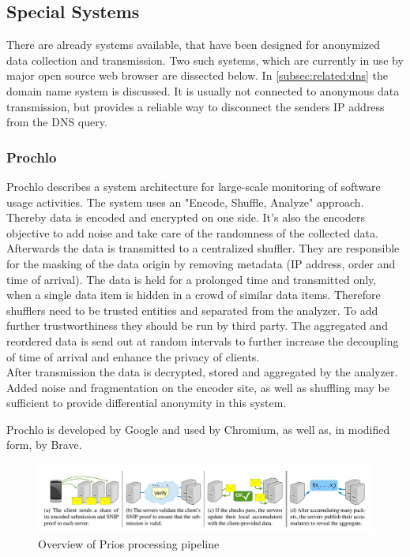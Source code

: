     
    \subsection{Special Systems}
        \label{subsec:related:special}
        There are already systems available, that have been designed for anonymized data collection and transmission. 
        Two such systems, which are currently in use by major open source web browser are dissected below. In \ref{subsec:related:dns} the domain name system is discussed. It is usually not connected to anonymous data transmission, but provides a reliable way to disconnect the senders IP address from the DNS query.
        
    \subsubsection{Prochlo}
        Prochlo describes a system architecture for large-scale monitoring of software usage activities. The system uses an "Encode, Shuffle, Analyze" approach. Thereby data is encoded and encrypted on one side. It's also the encoders objective to add noise and take care of the randomness of the collected data\cite{bittau_prochlo_2017}.\\
        Afterwards the data is transmitted to a centralized shuffler. They are responsible for the masking of the data origin by removing metadata (IP address, order and time of arrival).
        The data is held for a prolonged time and transmitted only, when a single data item is hidden in a crowd of similar data items. Therefore shufflers need to be trusted entities and separated from the analyzer\cite{bittau_prochlo_2017}. To add further trustworthiness they should be run by third party. The aggregated and reordered data is send out at random intervals to further increase the decoupling of time of arrival and enhance the privacy of clients.\\
        After transmission the data is decrypted, stored and aggregated by the analyzer. 
        Added noise and fragmentation on the encoder site, as well as shuffling may be sufficient to provide differential anonymity in this system.
        
        Prochlo is developed by Google and used by Chromium, as well as, in modified form, by Brave.
        \begin{figure}[hb]
            \centering
            \includegraphics[width=\textwidth]{latex/figures/prio_overview.jpg}
            \caption[Overview of Prios processing pipeline]{Overview of Prios processing pipeline\cite{corrigan-gibbs_prio_2017}}
            \label{fig:prio_overview}
        \end{figure}
    
